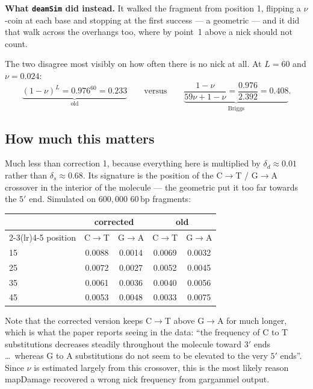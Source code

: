 \documentclass[11pt,a4paper]{article}
\begin{document}
\medskip
\noindent
\textbf{What \texttt{deamSim} did instead.} It walked the fragment from position 1,
flipping a $\nu$-coin at each base and stopping at the first success --- a geometric
--- and it did that walk across the overhangs too, where by point~1 above a nick
should not count.

The two disagree most visibly on how often there is no nick at all. At $L = 60$ and
$\nu = 0.024$:
\begin{equation}
\underbrace{(1-\nu)^{L} = 0.976^{60} = 0.233}_{\text{old}}
\qquad \text{versus} \qquad
\underbrace{\frac{1-\nu}{59\nu + 1 - \nu} = \frac{0.976}{2.392} = 0.408}_{\text{Briggs}} .
\end{equation}

\subsection{How much this matters}

Much less than correction 1, because everything here is multiplied by
$\delta_d \approx 0.01$ rather than $\delta_s \approx 0.68$. Its signature is the
position of the C$\to$T / G$\to$A crossover in the interior of the molecule --- the
geometric put it too far towards the $5'$ end. Simulated on $600{,}000$ $60$\,bp
fragments:

\begin{center}
\begin{tabular}{lcccc}
\toprule
& \multicolumn{2}{c}{corrected} & \multicolumn{2}{c}{old} \\
\cmidrule(lr){2-3}\cmidrule(lr){4-5}
position & C$\to$T & G$\to$A & C$\to$T & G$\to$A \\
\midrule
15 & 0.0088 & 0.0014 & 0.0069 & 0.0032 \\
25 & 0.0072 & 0.0027 & 0.0052 & 0.0045 \\
35 & 0.0061 & 0.0036 & 0.0040 & 0.0056 \\
45 & 0.0053 & 0.0048 & 0.0033 & 0.0075 \\
\bottomrule
\end{tabular}
\end{center}

\noindent
Note that the corrected version keeps C$\to$T above G$\to$A for much longer, which is
what the paper reports seeing in the data: ``the frequency of C to T substitutions
decreases steadily throughout the molecule toward $3'$ ends \ldots\ whereas G to A
substitutions do not seem to be elevated to the very $5'$ ends''. Since $\nu$ is
estimated largely from this crossover, this is the most likely reason mapDamage
recovered a wrong nick frequency from gargammel output.
\end{document}
